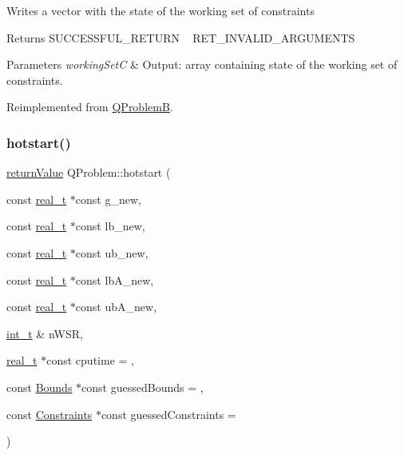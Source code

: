 Writes a vector with the state of the working set of constraints \begin{DoxyReturn}{Returns}
S\+U\+C\+C\+E\+S\+S\+F\+U\+L\+\_\+\+R\+E\+T\+U\+RN ~\newline
 R\+E\+T\+\_\+\+I\+N\+V\+A\+L\+I\+D\+\_\+\+A\+R\+G\+U\+M\+E\+N\+TS 
\end{DoxyReturn}

\begin{DoxyParams}{Parameters}
{\em working\+SetC} & Output\+: array containing state of the working set of constraints. \\
\hline
\end{DoxyParams}


Reimplemented from \hyperlink{class_q_problem_b_aa4b108a056ac2a35bf3938d1ca18f1cc}{Q\+ProblemB}.

\mbox{\label{class_q_problem_a524c59e7638d982e46501e7695ce1693}} 
\subsubsection{\texorpdfstring{hotstart()}{hotstart()}\hspace{0.1cm}{\footnotesize\ttfamily [1/2]}}
{\footnotesize\ttfamily \hyperlink{_message_handling_8hpp_a81d556f613bfbabd0b1f9488c0fa865e}{return\+Value} Q\+Problem\+::hotstart (\begin{DoxyParamCaption}\item[{const \hyperlink{qp_o_a_s_e_s__wrapper_8h_a0d00e2b3dfadee81331bbb39068570c4}{real\+\_\+t} $\ast$const}]{g\+\_\+new,  }\item[{const \hyperlink{qp_o_a_s_e_s__wrapper_8h_a0d00e2b3dfadee81331bbb39068570c4}{real\+\_\+t} $\ast$const}]{lb\+\_\+new,  }\item[{const \hyperlink{qp_o_a_s_e_s__wrapper_8h_a0d00e2b3dfadee81331bbb39068570c4}{real\+\_\+t} $\ast$const}]{ub\+\_\+new,  }\item[{const \hyperlink{qp_o_a_s_e_s__wrapper_8h_a0d00e2b3dfadee81331bbb39068570c4}{real\+\_\+t} $\ast$const}]{lb\+A\+\_\+new,  }\item[{const \hyperlink{qp_o_a_s_e_s__wrapper_8h_a0d00e2b3dfadee81331bbb39068570c4}{real\+\_\+t} $\ast$const}]{ub\+A\+\_\+new,  }\item[{\hyperlink{_types_8hpp_ab6fd6105e64ed14a0c9281326f05e623}{int\+\_\+t} \&}]{n\+W\+SR,  }\item[{\hyperlink{qp_o_a_s_e_s__wrapper_8h_a0d00e2b3dfadee81331bbb39068570c4}{real\+\_\+t} $\ast$const}]{cputime = {},  }\item[{const \hyperlink{class_bounds}{Bounds} $\ast$const}]{guessed\+Bounds = {},  }\item[{const \hyperlink{class_constraints}{Constraints} $\ast$const}]{guessed\+Constraints = {} }\end{DoxyParamCaption})}

